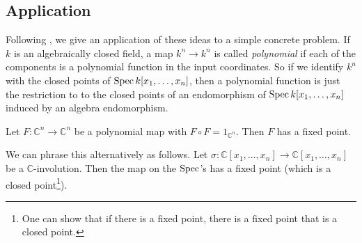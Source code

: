 \subsection{Application}

Following \cite{Se09}, we give an application of these ideas to a simple
concrete problem.
If $k$ is an algebraically closed field, a map $k^n \to k^n$ is called \emph{polynomial} if each of
the components is a polynomial function in the input coordinates. 
So if we identify $k^n $ with the closed points of $\operatorname{Spec}
k[x_1, \dots, x_n]$, then a polynomial function is just the
restriction to to the closed points of an endomorphism of $\operatorname{Spec}
k[x_1, \dots, x_n]$ induced by an algebra endomorphism.

\begin{theorem} 
Let $F: \mathbb{C}^n \to \mathbb{C}^n$ be a polynomial map with $F \circ F =
1_{\mathbb{C}^n}$. Then $F$ has a fixed point.
\end{theorem} 

We can phrase this alternatively as follows. Let $\sigma: \mathbb{C}[x_1,
\dots, x_n] \to \mathbb{C}[x_1, \dots, x_n]$ be a $\mathbb{C}$-involution.
Then the map on the $\operatorname{Spec}$'s has a fixed point (which is a closed
point\footnote{One can show that if there is a fixed point, there is a fixed
point that is a closed point.}).


